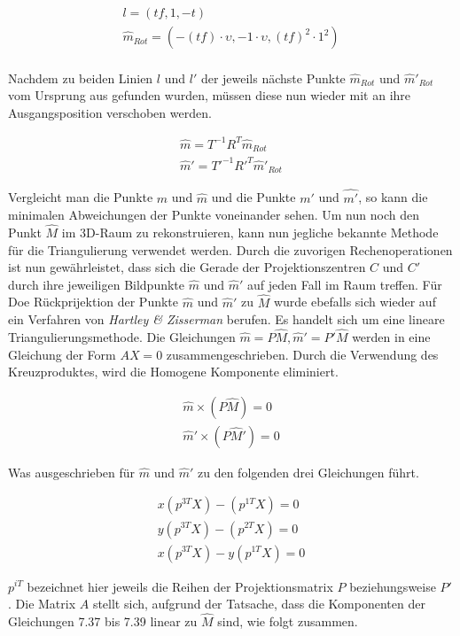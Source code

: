 \begin{gather}
	l = (tf, 1, -t)\\
	\hat{m}_{Rot} = (-(tf) \cdot \upsilon , - 1 \cdot \upsilon, (tf)^2 \cdot 1^2 )
\end{gather}\\

Nachdem zu beiden Linien $l$ und $l'$ der jeweils nächste Punkte $\hat{m}_{Rot}$ und $\hat{m}'_{Rot}$ vom Ursprung aus gefunden wurden, müssen diese nun wieder mit an ihre Ausgangsposition verschoben werden. 

\begin{gather}
	\hat{m} = T^{-1}R^T\hat{m}_{Rot}\\
	\hat{m}' = T'^{-1}R'^T\hat{m}'_{Rot}
\end{gather}

Vergleicht man die Punkte $m$ und $\hat{m}$ und die Punkte $m'$ und $\hat{m'}$, so kann die minimalen Abweichungen der Punkte voneinander sehen. Um nun noch den Punkt $\hat{M}$ im 3D-Raum zu rekonstruieren, kann nun jegliche bekannte Methode für die Triangulierung verwendet werden. Durch die zuvorigen Rechenoperationen ist nun gewährleistet, dass sich die Gerade der Projektionszentren $C$ und $C'$ durch ihre jeweiligen Bildpunkte $\hat{m}$ und $\hat{m}'$ auf jeden Fall im Raum treffen\cite{HZ}. Für Doe Rückprijektion der Punkte $\hat{m}$ und $\hat{m}'$ zu $\hat{M}$ wurde ebefalls sich wieder auf ein Verfahren von \textit{Hartley \& Zisserman} berufen. Es handelt sich um eine lineare Triangulierungsmethode. Die Gleichungen $\hat{m} = P\hat{M}, \hat{m}'  = P'\hat{M}$ werden in eine Gleichung der Form $AX = 0$ zusammengeschrieben. Durch die Verwendung des Kreuzproduktes, wird die Homogene Komponente eliminiert. 

\begin{gather}
	\hat{m} \times (P\hat{M}) = 0\\
	\hat{m}' \times (P\hat{M}') = 0
\end{gather}

Was ausgeschrieben für $\hat{m}$ und $\hat{m}'$ zu den folgenden drei Gleichungen führt.

\begin{gather}
x(p^{3T}X) - (p^{1T}X)=0\\
y(p^{3T}X) - (p^{2T}X)=0\\
x(p^{3T}X) - y(p^{1T}X)=0
\end{gather}

$p^{iT}$ bezeichnet hier jeweils die Reihen der Projektionsmatrix $P$ beziehungsweise $P'$. Die Matrix $A$ stellt sich, aufgrund der Tatsache, dass die Komponenten der Gleichungen 7.37 bis 7.39 linear zu $\hat{M}$ sind, wie folgt zusammen.

